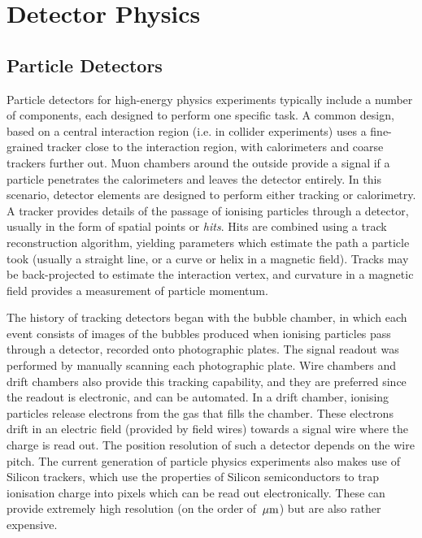 \chapter{Detector Physics}
\section{Particle Detectors}
Particle detectors for high-energy physics experiments typically include a number of components, each designed to perform one specific task. A common design, based on a central interaction region (i.e. in collider experiments) uses a fine-grained tracker close to the interaction region, with calorimeters and coarse trackers further out. Muon chambers around the outside provide a signal if a particle penetrates the calorimeters and leaves the detector entirely. In this scenario, detector elements are designed to perform either tracking or calorimetry. A tracker provides details of the passage of ionising particles through a detector, usually in the form of spatial points or \emph{hits}. Hits are combined using a track reconstruction algorithm, yielding parameters which estimate the path a particle took (usually a straight line, or a curve or helix in a magnetic field). Tracks may be back-projected to estimate the interaction vertex, and curvature in a magnetic field provides a measurement of particle momentum\citep{Green2008}. 

The history of tracking detectors began with the bubble chamber, in which each event consists of images of the bubbles produced when ionising particles pass through a detector, recorded onto photographic plates. The signal readout was performed by manually scanning each photographic plate. Wire chambers and drift chambers also provide this tracking capability, and they are preferred since the readout is electronic, and can be automated. In a drift chamber, ionising particles release electrons from the gas that fills the chamber. These electrons drift in an electric field (provided by field wires) towards a signal wire where the charge is read out. The position resolution of such a detector depends on the wire pitch. The current generation of particle physics experiments also makes use of Silicon trackers, which use the properties of Silicon semiconductors to trap ionisation charge into pixels which can be read out electronically. These can provide extremely high resolution (on the order of $\,\mu\mathrm{m}$) but are also rather expensive.

